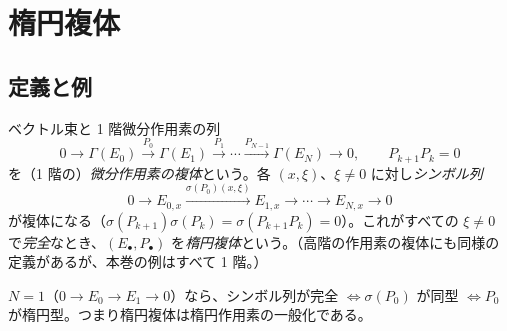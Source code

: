 \section{楕円複体}\label{sec:cx}
\subsection{定義と例}
\begin{defn}[楕円複体]\label{def:ellcx}
ベクトル束と 1 階微分作用素の列
\[
0\to\Gamma(E_0)\xrightarrow{P_0}\Gamma(E_1)\xrightarrow{P_1}\cdots\xrightarrow{P_{N-1}}\Gamma(E_N)\to0,\qquad P_{k+1}P_k=0
\]
を（1 階の）\emph{微分作用素の複体}という。各 $(x,\xi)$、$\xi\ne0$ に対し\emph{シンボル列}
\[
0\to E_{0,x}\xrightarrow{\sigma(P_0)(x,\xi)}E_{1,x}\to\cdots\to E_{N,x}\to0
\]
が複体になる（$\sigma(P_{k+1})\sigma(P_k)=\sigma(P_{k+1}P_k)=0$）。これがすべての $\xi\ne0$ で\emph{完全}なとき、$(E_\bullet,P_\bullet)$ を\emph{楕円複体}という。（高階の作用素の複体にも同様の定義があるが、本巻の例はすべて 1 階。）
\end{defn}
$N=1$（$0\to E_0\to E_1\to0$）なら、シンボル列が完全 $\iff\sigma(P_0)$ が同型 $\iff P_0$ が楕円型。つまり楕円複体は楕円作用素の一般化である。

